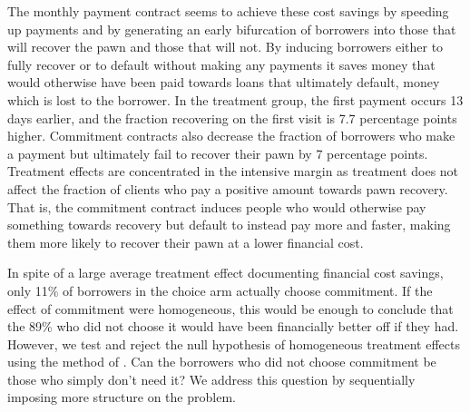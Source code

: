 \documentclass[oneside,11pt]{article}
\begin{document}
The monthly payment contract seems to achieve these cost savings by speeding up payments and by generating an early bifurcation of borrowers into those that will recover the pawn and those that will not.  By inducing borrowers either to fully recover or to default without making any payments it saves money that would otherwise have been paid towards loans that ultimately default, money which is lost to the borrower.  In the treatment group, the first payment occurs 13 days earlier, and the fraction recovering on the first visit is 7.7 percentage points higher. Commitment contracts also decrease the fraction of borrowers who make a payment but ultimately fail to recover their pawn by 7 percentage points.  Treatment effects are concentrated in the intensive margin as treatment does not affect the fraction of clients who pay a positive amount towards pawn recovery. That is, the commitment contract induces people who would otherwise pay something towards recovery but default to instead pay more and faster, making them more likely to recover their pawn at a lower financial cost. 

In spite of a large average treatment effect documenting financial cost savings, only 11\% of borrowers in the choice arm actually choose commitment. If the effect of commitment were homogeneous, this would be enough to conclude that the 89\% who did not choose it would have been financially better off if they had. However, we test and reject the null hypothesis of homogeneous treatment effects using the method of \cite{chernozhukov2018generic}. Can the borrowers who did not choose commitment be those who simply don’t need it? We address this question by sequentially imposing more structure on the problem. 
\end{document}

